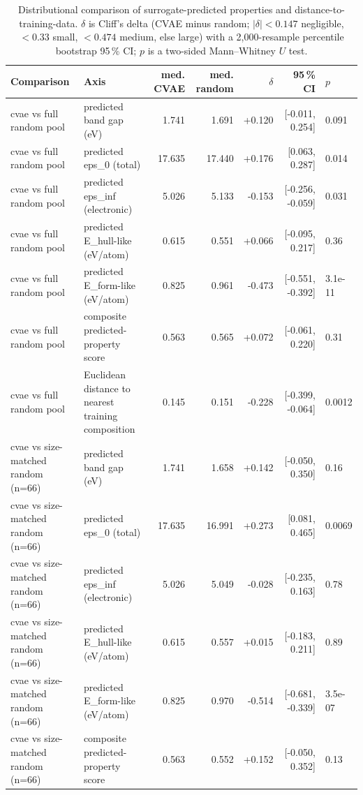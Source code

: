 \begin{table}[t]
\centering
\small
\caption{Distributional comparison of surrogate-predicted properties and distance-to-training-data. $\delta$ is Cliff's delta (CVAE minus random; $|\delta|<0.147$ negligible, $<0.33$ small, $<0.474$ medium, else large) with a 2{,}000-resample percentile bootstrap 95\,\% CI; $p$ is a two-sided Mann--Whitney $U$ test.}
\label{tab:a7_continuous}
\begin{tabular}{llrrrrl}
\toprule
Comparison & Axis & med. CVAE & med. random & $\delta$ & 95\,\% CI & $p$ \\
\midrule
cvae vs full random pool & predicted band gap (eV) & 1.741 & 1.691 & +0.120 & [-0.011, 0.254] & 0.091 \\
cvae vs full random pool & predicted eps\_0 (total) & 17.635 & 17.440 & +0.176 & [0.063, 0.287] & 0.014 \\
cvae vs full random pool & predicted eps\_inf (electronic) & 5.026 & 5.133 & -0.153 & [-0.256, -0.059] & 0.031 \\
cvae vs full random pool & predicted E\_hull-like (eV/atom) & 0.615 & 0.551 & +0.066 & [-0.095, 0.217] & 0.36 \\
cvae vs full random pool & predicted E\_form-like (eV/atom) & 0.825 & 0.961 & -0.473 & [-0.551, -0.392] & 3.1e-11 \\
cvae vs full random pool & composite predicted-property score & 0.563 & 0.565 & +0.072 & [-0.061, 0.220] & 0.31 \\
cvae vs full random pool & Euclidean distance to nearest training composition & 0.145 & 0.151 & -0.228 & [-0.399, -0.064] & 0.0012 \\
\midrule
cvae vs size-matched random (n=66) & predicted band gap (eV) & 1.741 & 1.658 & +0.142 & [-0.050, 0.350] & 0.16 \\
cvae vs size-matched random (n=66) & predicted eps\_0 (total) & 17.635 & 16.991 & +0.273 & [0.081, 0.465] & 0.0069 \\
cvae vs size-matched random (n=66) & predicted eps\_inf (electronic) & 5.026 & 5.049 & -0.028 & [-0.235, 0.163] & 0.78 \\
cvae vs size-matched random (n=66) & predicted E\_hull-like (eV/atom) & 0.615 & 0.557 & +0.015 & [-0.183, 0.211] & 0.89 \\
cvae vs size-matched random (n=66) & predicted E\_form-like (eV/atom) & 0.825 & 0.970 & -0.514 & [-0.681, -0.339] & 3.5e-07 \\
cvae vs size-matched random (n=66) & composite predicted-property score & 0.563 & 0.552 & +0.152 & [-0.050, 0.352] & 0.13 \\

\end{tabular}
\end{table}
